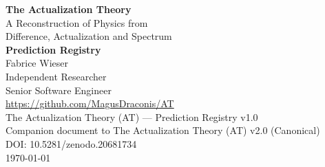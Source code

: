 \documentclass[11pt,a4paper]{article}
\begin{document}
\thispagestyle{empty}
\begin{center}
  \vspace*{1.5cm}
  {\Huge\bfseries The Actualization Theory}\\[0.6em]
  {\LARGE A Reconstruction of Physics from\\ Difference, Actualization and Spectrum}\\[1.2em]
  {\LARGE\bfseries Prediction Registry}\\[2.2em]
  {\Large Fabrice Wieser}\\[0.5em]
  {\small Independent Researcher}\\[0.3em]
  {\small Senior Software Engineer}\\[0.3em]
  {\small \url{https://github.com/MagusDraconis/AT}}\\[2.0em]
  {\large The Actualization Theory (AT) --- Prediction Registry v1.0}\\[0.5em]
  {\large Companion document to The Actualization Theory (AT) v2.0 (Canonical)}\\[0.5em]
  {\large DOI: 10.5281/zenodo.20681734}\\[0.5em]
  {\large \today}
  \vfill
\end{center}
\clearpage

\begin{abstract}
\noindent
This document is the official \emph{Prediction Registry} of The Actualization Theory
(AT): a standalone, publication-grade registry of the quantitative and qualitative
predictions derived from the canonical theory, compiled before future experimental
confirmation. Every entry is derived from the accepted canonical derivations of the
monograph (Difference $\to$ Actualization $\to$ Inevitable Spectrum $\to$ Physics), carries
its derivation source, its dependency chain, its numerical value (where applicable), its
uncertainty, its validation status, and its falsification criterion. The registry uses no
new physics, no new fits, and no retrospective reinterpretation; it records the canonical
content as published. Statuses distinguish \textsc{Confirmed} (pre-registered target
verified), \textsc{Consistent} (value matches current observation), \textsc{Pending}
(awaiting validation), and \textsc{Falsified} (contradicted by observation). No registered
prediction is currently falsified.
\end{abstract}
\end{document}
